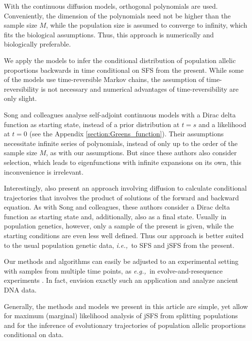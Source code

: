 \documentclass[preprint]{elsarticle}
\newcommand\eg{{\it e.g.,}}
\newcommand\ie{{\it i.e.,}}
\begin{document}
With the continuous diffusion models, orthogonal polynomials are used. Conveniently, the dimension of the polynomials need not be higher than the sample size $M$, while the population size is assumed to converge to infinity, which fits the biological assumptions. Thus, this approach is numerically and biologically preferable. 

We apply the models to infer the conditional distribution of population allelic proportions backwards in time conditional on SFS from the present. While some of the models use time-reversible Markov chains, the assumption of time-reversibility is not necessary and numerical advantages of time-reversibility are only slight.

Song and colleagues \citep{Song12,Stei13,Stei14,Zivk15} analyse self-adjoint continuous models with a Dirac delta function as starting state, instead of a prior distribution at $t=s$ and a likelihood at $t=0$ (see the Appendix \ref{section:Greens_function}). Their assumptions necessitate infinite series of polynomials, instead of only up to the order of the sample size $M$, as with our assumptions. But since these authors also consider selection, which leads to eigenfunctions with infinite expansions on its own, this inconvenience is irrelevant. 

Interestingly, \citet{Zhao13} also present an approach involving diffusion to calculate conditional trajectories that involves the product of solutions of the forward and backward equation. As with Song and colleagues, these authors consider a Dirac delta function as starting state and, additionally, also as a final state. Usually in population genetics, however, only a sample of the present is given, while the starting conditions are even less well defined. Thus our approach is better suited to the usual population genetic data, \ie\ to SFS and jSFS from the present. 

Our methods and algorithms can easily be adjusted to an experimental setting with samples from multiple time points, as \eg\ in evolve-and-resequence experiments \citep{Kofl14}. In fact, \citet{Stei14} envision exactly such an application and analyze ancient DNA data. 

Generally, the methods and models we present in this article are simple, yet allow for maximum (marginal) likelihood analysis of jSFS from splitting populations and for the inference of evolutionary trajectories of population allelic proportions conditional on data. 
 
%
\end{document}
